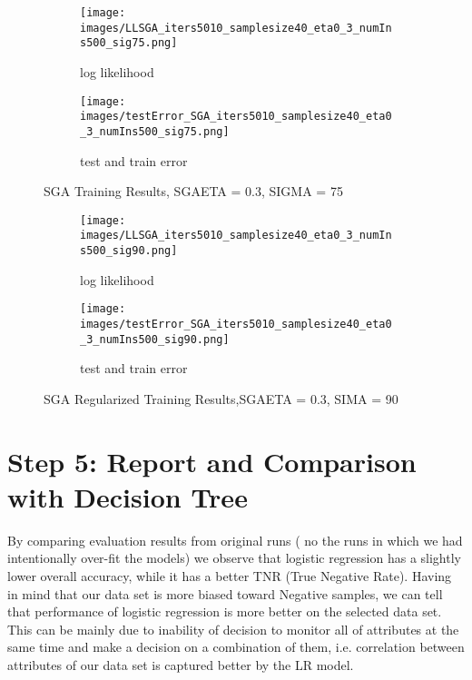 \documentclass[a4paper,11pt]{article}
\begin{document}
\begin{figure}[t]
\begin{subfigure}{.5\textwidth}
  \texttt{[image: images/LLSGA\_iters5010\_samplesize40\_eta0\_3\_numIns500\_sig75.png]}
	\centering
  \caption{log likelihood }
  \label{fig:LLSGA_sig75}
\end{subfigure}
\begin{subfigure}{.5\textwidth}
  \texttt{[image: images/testError\_SGA\_iters5010\_samplesize40\_eta0\_3\_numIns500\_sig75.png]}
	\centering
  \caption{test and train error }
  \label{fig:SGA40_sig75_er}
\end{subfigure}
  \caption{SGA Training Results, SGA\underline{\hspace{.2cm}}ETA = 0.3, SIGMA = 75}
  \label{fig:SGA_sig75}
\end{figure}
\begin{figure}[t]
\begin{subfigure}{.5\textwidth}
  \texttt{[image: images/LLSGA\_iters5010\_samplesize40\_eta0\_3\_numIns500\_sig90.png]}
	\centering
  \caption{log likelihood }
  \label{fig:LLSGA_sig90}
\end{subfigure}
\begin{subfigure}{.5\textwidth}
  \texttt{[image: images/testError\_SGA\_iters5010\_samplesize40\_eta0\_3\_numIns500\_sig90.png]}
	\centering
  \caption{test and train error  }
  \label{fig:SGA40_sig90_er}
\end{subfigure}
  \caption{SGA Regularized Training Results,SGA\underline{\hspace{.2cm}}ETA = 0.3, SIMA = 90}
  \label{fig:SGA_sig90}
\end{figure}




\newpage
\section*{Step 5: Report and Comparison with Decision Tree}
By comparing evaluation results from original runs ( no the runs in which we had  intentionally over-fit the models) we observe that logistic regression has a slightly lower overall accuracy, while it has a better TNR (True Negative Rate). Having in mind that our data set is more biased toward Negative samples, we can tell that performance of logistic regression is more better on the selected data set. This can be mainly due to inability of decision to monitor all of attributes at the same time and make a decision on a combination of them, i.e. correlation between attributes of our data set is captured better by the LR model. 
\end{document}
